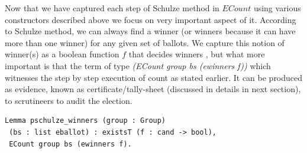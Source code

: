 \documentclass{llncs}
\begin{document}
Now that we have captured each step of Schulze method in $ECount$ using various 
constructors described above we focus on very important aspect of it. 
According to Schulze method, we can always find a winner (or winners because
it can have more  than one winner) for any given set of 
ballots. We capture this notion of winner(s) as a boolean 
function $f$ that decides winners \cite{Pattinson:2017:SVE}, but what more
important is that the term of type \textit{(ECount group bs (ewinners f))} 
 which witnesses the step by step execution of count as stated earlier. 
It can be produced as evidence, 
known as certificate/tally-sheet (discussed in details in next section), 
to scrutineers to audit the election. 



\begin{lstlisting}[frame=single,basicstyle=\ttfamily\footnotesize]
Lemma pschulze_winners (group : Group) 
 (bs : list eballot) : existsT (f : cand -> bool), 
 ECount group bs (ewinners f).
\end{lstlisting}
\end{document}
